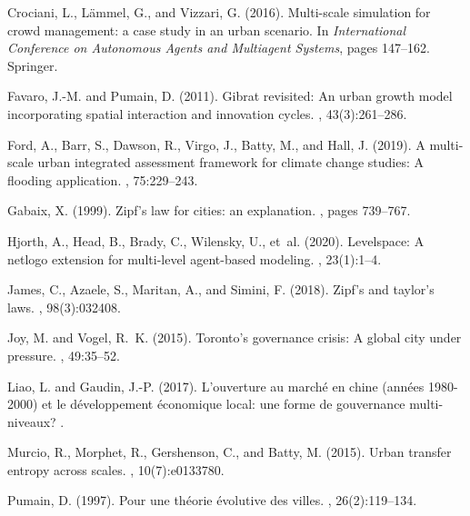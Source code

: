 \documentclass[11pt]{article}
\begin{document}
\begin{thebibliography}{}
Crociani, L., L{\"a}mmel, G., and Vizzari, G. (2016).
\newblock Multi-scale simulation for crowd management: a case study in an urban
  scenario.
\newblock In {\em International Conference on Autonomous Agents and Multiagent
  Systems}, pages 147--162. Springer.

Favaro, J.-M. and Pumain, D. (2011).
\newblock Gibrat revisited: An urban growth model incorporating spatial
  interaction and innovation cycles.
, 43(3):261--286.

Ford, A., Barr, S., Dawson, R., Virgo, J., Batty, M., and Hall, J. (2019).
\newblock A multi-scale urban integrated assessment framework for climate
  change studies: A flooding application.
, 75:229--243.

Gabaix, X. (1999).
\newblock Zipf's law for cities: an explanation.
, pages 739--767.

Hjorth, A., Head, B., Brady, C., Wilensky, U., et~al. (2020).
\newblock Levelspace: A netlogo extension for multi-level agent-based modeling.
,
  23(1):1--4.

James, C., Azaele, S., Maritan, A., and Simini, F. (2018).
\newblock Zipf's and taylor's laws.
, 98(3):032408.

Joy, M. and Vogel, R.~K. (2015).
\newblock Toronto’s governance crisis: A global city under pressure.
, 49:35--52.

Liao, L. and Gaudin, J.-P. (2017).
\newblock L’ouverture au march{\'e} en chine (ann{\'e}es 1980-2000) et le
  d{\'e}veloppement {\'e}conomique local: une forme de gouvernance
  multi-niveaux?
.

Murcio, R., Morphet, R., Gershenson, C., and Batty, M. (2015).
\newblock Urban transfer entropy across scales.
, 10(7):e0133780.

Pumain, D. (1997).
\newblock Pour une th{\'e}orie {\'e}volutive des villes.
, 26(2):119--134.


\end{thebibliography}
\end{document}
